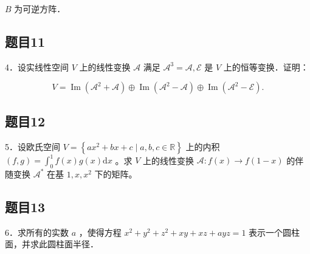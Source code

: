 \documentclass{article}
\begin{document}
\(B\) 为可逆方阵．

\subsection{题目11}
4．设实线性空间 \(V\) 上的线性变换 \(\mathcal{A}\) 满足 \(\mathcal{A}^{3}=\mathcal{A}, \mathcal{E}\) 是 \(V\) 上的恒等变换．证明：

\[
V=\operatorname{Im}\left(\mathcal{A}^{2}+\mathcal{A}\right) \oplus \operatorname{Im}\left(\mathcal{A}^{2}-\mathcal{A}\right) \oplus \operatorname{Im}\left(\mathcal{A}^{2}-\mathcal{E}\right) .
\]

\subsection{题目12}
5．设欧氏空间 \(V=\left\{a x^{2}+b x+c \mid a, b, c \in \mathbb{R}\right\}\) 上的内积 \((f, g)=\int_{0}^{1} f(x) g(x) \mathrm{d} x\) 。求 \(V\) 上的线性变换 \(\mathcal{A}: f(x) \rightarrow f(1-x)\) 的伴随变换 \(\mathcal{A}^{*}\) 在基 \(1, x, x^{2}\) 下的矩阵。

\subsection{题目13}
6．求所有的实数 \(a\) ，使得方程 \(x^{2}+y^{2}+z^{2}+x y+x z+a y z=1\) 表示一个圆柱面，并求此圆柱面半径．
\end{document}
